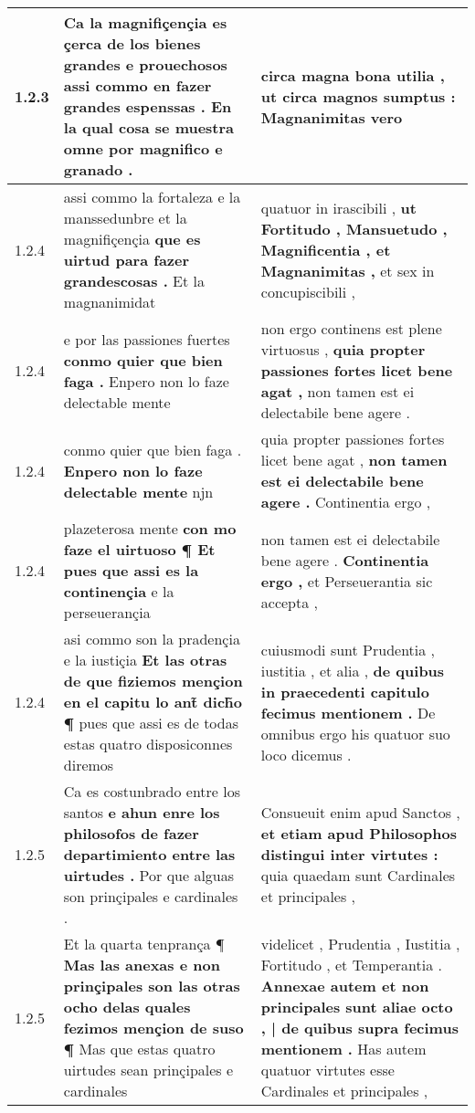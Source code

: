 \begin{tabular}{|p{1cm}|p{6.5cm}|p{6.5cm}|}
1.2.3 & Ca la magnifiçençia es çerca de los bienes grandes e prouechosos \textbf{ assi commo en fazer grandes espenssas . } En la qual cosa se muestra omne por magnifico e granado . & circa magna bona utilia , \textbf{ ut circa magnos sumptus : } Magnanimitas vero \\\hline
1.2.4 & assi commo la fortaleza e la manssedunbre et la magnifiçençia \textbf{ que es uirtud para fazer grandescosas . } Et la magnanimidat & quatuor in irascibili , \textbf{ ut Fortitudo , Mansuetudo , Magnificentia , et Magnanimitas , } et sex in concupiscibili , \\\hline
1.2.4 & e por las passiones fuertes \textbf{ conmo quier que bien faga . } Enpero non lo faze delectable mente & non ergo continens est plene virtuosus , \textbf{ quia propter passiones fortes licet bene agat , } non tamen est ei delectabile bene agere . \\\hline
1.2.4 & conmo quier que bien faga . \textbf{ Enpero non lo faze delectable mente } njn & quia propter passiones fortes licet bene agat , \textbf{ non tamen est ei delectabile bene agere . } Continentia ergo , \\\hline
1.2.4 & plazeterosa mente \textbf{ con mo faze el uirtuoso ¶ Et pues que assi es la continençia } e la perseuerançia & non tamen est ei delectabile bene agere . \textbf{ Continentia ergo , } et Perseuerantia sic accepta , \\\hline
1.2.4 & asi commo son la pradençia e la iustiçia \textbf{ Et las otras de que fiziemos mençion en el capitu lo ant̃ dich̃o ¶ } pues que assi es de todas estas quatro disposiconnes diremos & cuiusmodi sunt Prudentia , iustitia , et alia , \textbf{ de quibus in praecedenti capitulo fecimus mentionem . } De omnibus ergo his quatuor suo loco dicemus . \\\hline
1.2.5 & Ca es costunbrado entre los santos \textbf{ e ahun enre los philosofos de fazer departimiento entre las uirtudes . } Por que alguas son prinçipales e cardinales . & Consueuit enim apud Sanctos , \textbf{ et etiam apud Philosophos distingui inter virtutes : } quia quaedam sunt Cardinales et principales , \\\hline
1.2.5 & Et la quarta tenprança ¶ \textbf{ Mas las anexas e non prinçipales son las otras ocho delas quales fezimos mençion de suso ¶ } Mas que estas quatro uirtudes sean prinçipales e cardinales & videlicet , Prudentia , Iustitia , Fortitudo , et Temperantia . \textbf{ Annexae autem et non principales sunt aliae octo , | de quibus supra fecimus mentionem . } Has autem quatuor virtutes esse Cardinales et principales , \\\hline

\end{tabular}
